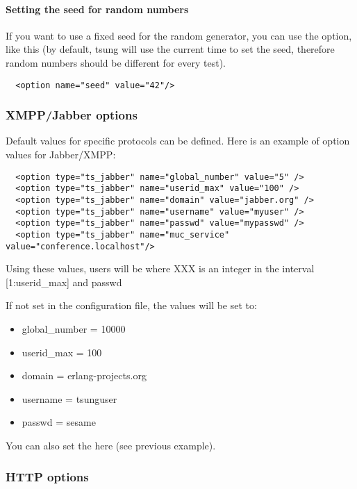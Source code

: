 \documentclass{TSUNG-en}
\begin{document}
\paragraph{Setting the  seed for random numbers}

If you want to use a fixed seed for the random generator, you can use
the  option, like this (by default, tsung will use the
current time to set the seed, therefore random numbers should be
different for every test).

\begin{Verbatim}
  <option name="seed" value="42"/>
\end{Verbatim}


\subsubsection{XMPP/Jabber options}
\label{sec:jabber-options}

Default values for specific protocols can be defined. Here is an
example of option values for Jabber/XMPP:

\begin{Verbatim}
  <option type="ts_jabber" name="global_number" value="5" />
  <option type="ts_jabber" name="userid_max" value="100" />
  <option type="ts_jabber" name="domain" value="jabber.org" />
  <option type="ts_jabber" name="username" value="myuser" />
  <option type="ts_jabber" name="passwd" value="mypasswd" />
  <option type="ts_jabber" name="muc_service" value="conference.localhost"/>
\end{Verbatim}

Using these values, users will be  where XXX is an integer in
the interval [1:userid\_max] and passwd  

If not set in the configuration file, the values will be set to:
\begin{itemize}
\item global\_number = 10000
\item userid\_max    = 100
\item domain   = erlang-projects.org
\item username = tsunguser
\item passwd   = sesame
\end{itemize}

You can also set the  here (see previous example).

\subsubsection{HTTP options}
\end{document}
